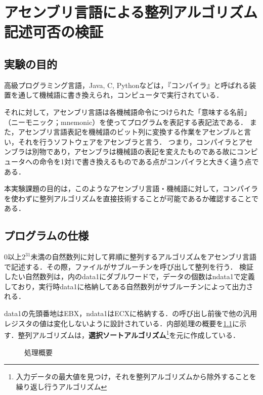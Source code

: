 \chapter{アセンブリ言語による整列アルゴリズム記述可否の検証}\label{chap1}
\section{実験の目的}
高級プログラミング言語，{\ttfamily Java, C, Python}などは，『コンパイラ』と呼ばれる装置を通して機械語に書き換えられ，コンピュータで実行されている．\par
それに対して，アセンブリ言語は各機械語命令につけられた「意味する名前」（ニーモニック；mnemonic）を使ってプログラムを表記する表記法である．\cite[第1章]{pl2text}
また，アセンブリ言語表記を機械語のビット列に変換する作業をアセンブルと言い，それを行うソフトウェアをアセンブラと言う．
つまり，コンパイラとアセンブラは別物であり，アセンブラは機械語の表記を変えたものである故にコンピュータへの命令を1対1で書き換えるものである点がコンパイラと大きく違う点である．\par
本実験課題の目的は，このようなアセンブリ言語・機械語に対して，コンパイラを使わずに整列アルゴリズムを直接技術することが可能であるか確認することである．
\section{プログラムの仕様}
\(0\)以上\(2^{31}\)未満の自然数列に対して昇順に整列するアルゴリズムをアセンブリ言語で記述する．その際，\testsort ファイルが\sort サブルーチンを呼び出して整列を行う．
検証したい自然数列は，\testsort 内の{\ttfamily data1}にダブルワードで，データの個数は{\ttfamily ndata1}で定義しており，\testsort 実行時{\ttfamily data1}に格納してある自然数列が\print サブルーチンによって出力される．\par
{\ttfamily data1}の先頭番地は{\ttfamily EBX}，{\ttfamily ndata1}は{\ttfamily ECX}に格納する．\sort の呼び出し前後で他の汎用レジスタの値は変化しないように設計されている．内部処理の概要を\ref{kadai1:abs}に示す．整列アルゴリズムは，\textbf{選択ソートアルゴリズム}\footnote{入力データの最大値を見つけ，それを整列アルゴリズムから除外することを繰り返し行うアルゴリズム\cite[p.49]{アルゴリズムとデータ構造}}を元に作成している．
\begin{figure}[H]
    \centering
    \caption{処理概要}
    \label{kadai1:abs}
\end{figure}
